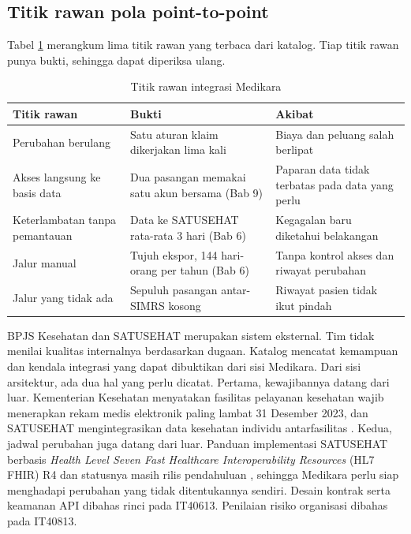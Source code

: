 \subsection*{Titik rawan pola point-to-point}

Tabel \ref{tab:ch07-titik-rawan} merangkum lima titik rawan yang terbaca dari katalog. Tiap titik rawan punya
bukti, sehingga dapat diperiksa ulang.

\begin{table}[!htb]
  \centering
  \caption{Titik rawan integrasi Medikara}
  \label{tab:ch07-titik-rawan}
  \small
  \begin{tabularx}{\textwidth}{>{\raggedright\arraybackslash}p{3.0cm}>{\raggedright\arraybackslash}X>{\raggedright\arraybackslash}X}
    \hline
    \textbf{Titik rawan} & \textbf{Bukti} & \textbf{Akibat} \\
    \hline
    Perubahan berulang & Satu aturan klaim dikerjakan lima kali & Biaya dan peluang salah berlipat \\
    \hline
    Akses langsung ke basis data & Dua pasangan memakai satu akun bersama (Bab 9) & Paparan data tidak terbatas pada data yang perlu \\
    \hline
    Keterlambatan tanpa pemantauan & Data ke SATUSEHAT rata-rata 3 hari (Bab 6) & Kegagalan baru diketahui belakangan \\
    \hline
    Jalur manual & Tujuh ekspor, 144 hari-orang per tahun (Bab 6) & Tanpa kontrol akses dan riwayat perubahan \\
    \hline
    Jalur yang tidak ada & Sepuluh pasangan antar-SIMRS kosong & Riwayat pasien tidak ikut pindah \\
    \hline
  \end{tabularx}
\end{table}

BPJS Kesehatan dan SATUSEHAT merupakan sistem eksternal. Tim tidak menilai kualitas internalnya berdasarkan dugaan.
Katalog mencatat kemampuan dan kendala integrasi yang dapat dibuktikan dari sisi Medikara. Dari sisi arsitektur, ada
dua hal yang perlu dicatat. Pertama, kewajibannya datang dari luar. Kementerian Kesehatan menyatakan fasilitas
pelayanan kesehatan wajib menerapkan rekam medis elektronik paling lambat 31 Desember 2023, dan SATUSEHAT
mengintegrasikan data kesehatan individu antarfasilitas \cite{c07-kemenkes2023rme}. Kedua, jadwal perubahan juga datang
dari luar. Panduan implementasi SATUSEHAT berbasis \textit{Health Level Seven Fast Healthcare Interoperability
Resources} (HL7 FHIR) R4 dan statusnya masih rilis pendahuluan \cite{c07-satusehat-ig}, sehingga Medikara perlu siap
menghadapi perubahan yang tidak ditentukannya sendiri. Desain kontrak serta keamanan API dibahas rinci pada IT40613.
Penilaian risiko organisasi dibahas pada IT40813.

